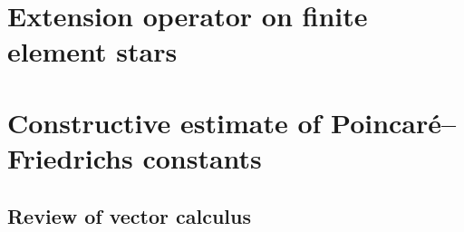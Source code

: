 \documentclass[a4paper]{article}
\begin{document}
\newpage 








\section{Extension operator on finite element stars}\label{section:extension}

\section{Constructive estimate of Poincar\'e--Friedrichs constants}\label{section:poincarefriedrichs}


\subsection{Review of vector calculus}
\end{document}
